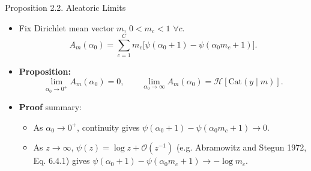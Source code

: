 \begin{frame}{Proposition 2.2. Aleatoric Limits}
\label{frm:backup-aleatoric-limits}
\begin{itemize}
\setlength{\itemsep}{4mm}
\item Fix Dirichlet mean vector $m$, $0<m_c<1$ $\forall c$.
\[
A_m(\alpha_0)
=\sum_{c=1}^{C}m_c\bigl[\psi(\alpha_0+1)-\psi(\alpha_0m_c+1)\bigr].
\]
\item \textbf{Proposition:}
\[
\lim_{\alpha_0\to0^+}A_m(\alpha_0)=0,
\qquad
\lim_{\alpha_0\to\infty}A_m(\alpha_0)
=\mathcal H[\mathrm{Cat}(y\mid m)].
\]
\item \textbf{Proof} summary:
\begin{itemize}
\item As $\alpha_0\to0^+$, continuity gives $\psi(\alpha_0+1)-\psi(\alpha_0m_c+1)\to0$.
\item As $z\to\infty$, $\psi(z)=\log z+\mathcal O(z^{-1})$ (e.g. Abramowitz and Stegun 1972, Eq. 6.4.1) gives
$\psi(\alpha_0+1)-\psi(\alpha_0m_c+1)\to-\log m_c$.
\end{itemize}
\end{itemize}
\end{frame}

